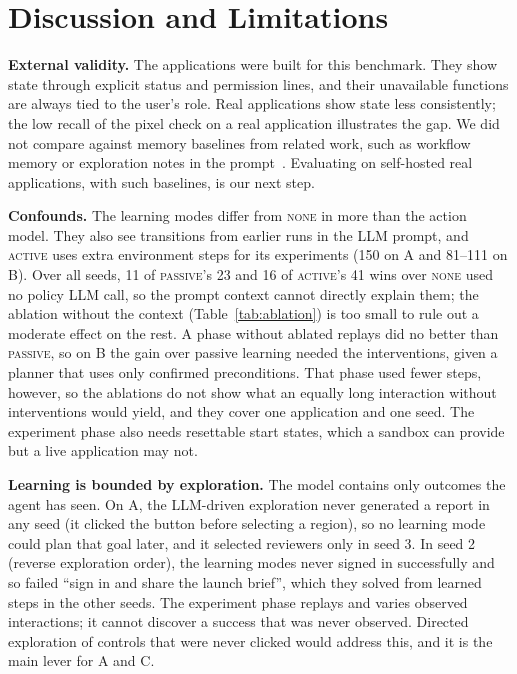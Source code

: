 \documentclass[conference]{IEEEtran}
\newcommand{\modeNone}{\textsc{none}}
\newcommand{\modePassive}{\textsc{passive}}
\newcommand{\modeActive}{\textsc{active}}
\begin{document}
\section{Discussion and Limitations}
\label{sec:discussion}
\textbf{External validity.} The applications were built for this benchmark. They show state through explicit status and permission lines, and their unavailable functions are always tied to the user's role. Real applications show state less consistently; the low recall of the pixel check on a real application illustrates the gap. We did not compare against memory baselines from related work, such as workflow memory or exploration notes in the prompt~\cite{wang2025awm,zhang2023appagent}. Evaluating on self-hosted real applications, with such baselines, is our next step.

\textbf{Confounds.} %
The learning modes differ from \modeNone{} in more than the action model. They also see transitions from earlier runs in the LLM prompt, and \modeActive{} uses extra environment steps for its experiments (150 on A and 81--111 on B). Over all seeds, 11 of \modePassive{}'s 23 and 16 of \modeActive{}'s 41 wins over \modeNone{} used no policy LLM call, so the prompt context cannot directly explain them; the ablation without the context (Table~\ref{tab:ablation}) is too small to rule out a moderate effect on the rest. A phase without ablated replays did no better than \modePassive{}, so on B the gain over passive learning needed the interventions, given a planner that uses only confirmed preconditions. That phase used fewer steps, however, so the ablations do not show what an equally long interaction without interventions would yield, and they cover one application and one seed. The experiment phase also needs resettable start states, which a sandbox can provide but a live application may not.

\textbf{Learning is bounded by exploration.} %
The model contains only outcomes the agent has seen. On A, the LLM-driven exploration never generated a report in any seed (it clicked the button before selecting a region), so no learning mode could plan that goal later, and it selected reviewers only in seed 3. In seed 2 (reverse exploration order), the learning modes never signed in successfully and so failed ``sign in and share the launch brief'', which they solved from learned steps in the other seeds. The experiment phase replays and varies observed interactions; it cannot discover a success that was never observed. Directed exploration of controls that were never clicked would address this, and it is the main lever for A and C.
\end{document}

